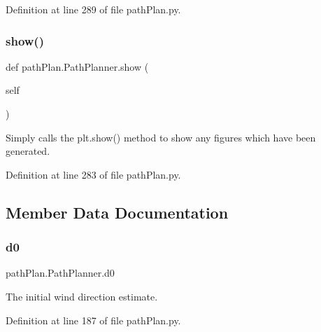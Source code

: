Definition at line 289 of file path\+Plan.\+py.

\mbox{\label{classpath_plan_1_1_path_planner_ac2b91da25e1f81aa210e83d502f9a008}} 
\subsubsection{\texorpdfstring{show()}{show()}}
{\footnotesize\ttfamily def path\+Plan.\+Path\+Planner.\+show (\begin{DoxyParamCaption}\item[{}]{self }\end{DoxyParamCaption})}



Simply calls the plt.\+show() method to show any figures which have been generated. 



Definition at line 283 of file path\+Plan.\+py.



\subsection{Member Data Documentation}
\mbox{\label{classpath_plan_1_1_path_planner_a508cce57c5e6deb7880fe2ef631c983e}} 
\subsubsection{\texorpdfstring{d0}{d0}}
{\footnotesize\ttfamily path\+Plan.\+Path\+Planner.\+d0}



The initial wind direction estimate. 



Definition at line 187 of file path\+Plan.\+py.

\mbox{\label{classpath_plan_1_1_path_planner_aec7491cbbb5ea16f5fbeceecbb405efd}} 

